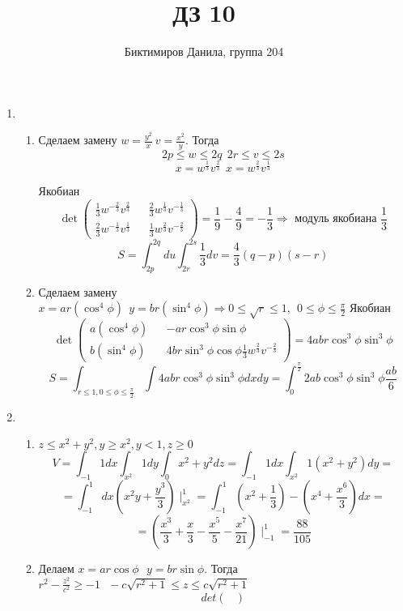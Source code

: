 \documentclass[11pt]{article}
\begin{document}
	
	\author{Биктимиров Данила, группа 204}
	\title{ДЗ 10}
	\date{}
	\maketitle
	
	\medskip
	
	\begin{enumerate}
		\item \begin{enumerate}
			\item Сделаем замену $w = \frac{y^2}{x}\:v = \frac{x^2}{y}$. Тогда $$2p\le w\le 2q \:\: 2r\le v \le 2s$$ $$ x=w^{\frac{1}{3}}v^{\frac{2}{3}} \:\: x=w^{\frac{2}{3}}v^{\frac{1}{3}}$$
			
			Якобиан $$\det \begin{pmatrix}
				\frac{1}{3}w^{-\frac{2}{3}}v^{\frac{2}{3}} && \frac{2}{3}w^{\frac{1}{3}}v^{-\frac{1}{3}} \\
				\frac{2}{3}w^{-\frac{1}{3}}v^{\frac{1}{3}} && \frac{1}{3}w^{\frac{2}{3}}v^{-\frac{2}{3}}
			\end{pmatrix} = \frac{1}{9}-\frac{4}{9} = -\frac{1}{3} \Rightarrow \text{ модуль якобиана } \frac{1}{3}$$
			$$ S=\int_{2p}^{2q}du\int_{2r}^{2s}\frac{1}{3}dv=\frac{4}{3}(q-p)(s-r) $$
			\item Сделаем замену $x=ar(\cos^4 \phi)\:\:y = br(\sin^4 \phi)\Rightarrow0\le\sqrt{r}\le 1,\:\: 0\le \phi \le\frac{\pi}{2}$ Якобиан $$\det \begin{pmatrix}
				a(\cos^4 \phi) && -ar\cos^3\phi\sin\phi \\
				b(\sin^4 \phi) && 4br\sin^3\phi\cos\phi \frac{1}{3}w^{\frac{2}{3}}v^{-\frac{2}{3}}
			\end{pmatrix} = 4abr\cos^3\phi\sin^3\phi$$
			$$ S=\int_{r\le1,0\le\phi\le\frac{\pi}{2}}\int 4abr\cos^3\phi\sin^3\phi dx dy=\int_{0}^{\frac{\pi}{2}}2ab\cos^3\phi\sin^3\phi\frac{ab}{6} $$
		\end{enumerate}
	\item \begin{enumerate}
		\item $z \leq x^2 + y^2, y \geq x^2, y < 1, z \geq 0$
		$$ V = \int_{-1}{1}dx\int_{x^2}{1}dy\int_{0}{x^2+y^2}dz=\int_{-1}{1}dx\int_{x^2}{1}(x^2+y^2)dy = $$ $$= \int_{-1}^{1}dx\left(x^2y+\frac{y^3}{3}\right) \mid_{x^2}^1 = \int_{-1}^{1}\left(x^2+\frac{1}{3}\right)-\left(x^4+\frac{x^6}{3}\right)dx =$$ $$ =\left(\frac{x^3}{3} + \frac{x}{3}-\frac{x^5}{5}-\frac{x^7}{21}\right)\mid_{-1}^1 =\frac{88}{105}$$
		\item Делаем $x=ar\cos \phi\:\:\: y=br\sin\phi$. Тогда $r^2-\frac{z^2}{c^2}\ge -1\:\:\:-c\sqrt{r^2+1}\le z\le c\sqrt{r^2+1}$ $$ det\begin{pmatrix}

\end{pmatrix}$$
\end{enumerate}
\end{enumerate}
\end{document}
